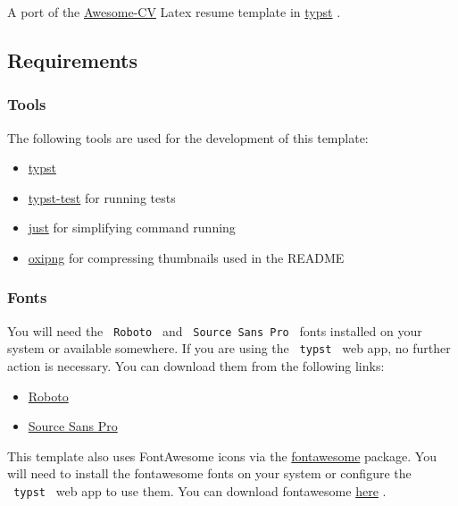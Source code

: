 A port of the \href{https://github.com/posquit0/Awesome-CV}{Awesome-CV}
Latex resume template in \href{https://github.com/typst/typst}{typst} .

\subsection{Requirements}\label{requirements}

\subsubsection{Tools}\label{tools}

The following tools are used for the development of this template:

\begin{itemize}
\tightlist
\item
  \href{https://github.com/typst/typst}{typst}
\item
  \href{https://github.com/tingerrr/typst-test}{typst-test} for running
  tests
\item
  \href{https://github.com/casey/just}{just} for simplifying command
  running
\item
  \href{https://github.com/shssoichiro/oxipng}{oxipng} for compressing
  thumbnails used in the README
\end{itemize}

\subsubsection{Fonts}\label{fonts}

You will need the \texttt{\ Roboto\ } and \texttt{\ Source\ Sans\ Pro\ }
fonts installed on your system or available somewhere. If you are using
the \texttt{\ typst\ } web app, no further action is necessary. You can
download them from the following links:

\begin{itemize}
\tightlist
\item
  \href{https://fonts.google.com/specimen/Roboto}{Roboto}
\item
  \href{https://github.com/adobe-fonts/source-sans-pro}{Source Sans Pro}
\end{itemize}

This template also uses FontAwesome icons via the
\href{https://typst.app/universe/package/fontawesome}{fontawesome}
package. You will need to install the fontawesome fonts on your system
or configure the \texttt{\ typst\ } web app to use them. You can
download fontawesome \href{https://fontawesome.com/download}{here} .

